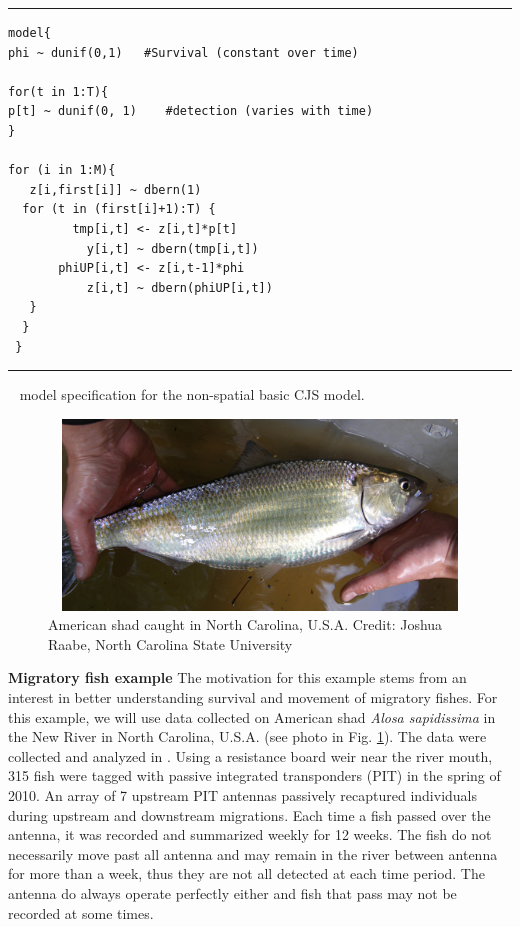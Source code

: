 \begin{panel}[htp]
\centering
\rule[0.1in]{\textwidth}{.03in}
{\small
\begin{verbatim}
model{
phi ~ dunif(0,1)   #Survival (constant over time)

for(t in 1:T){
p[t] ~ dunif(0, 1)    #detection (varies with time)
}

for (i in 1:M){
   z[i,first[i]] ~ dbern(1)
  for (t in (first[i]+1):T) {
         tmp[i,t] <- z[i,t]*p[t]
           y[i,t] ~ dbern(tmp[i,t])
       phiUP[i,t] <- z[i,t-1]*phi
           z[i,t] ~ dbern(phiUP[i,t])
   }
  }
 }
\end{verbatim}
}

\rule[-0.1in]{\textwidth}{.03in}
\caption{
\jags~ model specification for the non-spatial basic CJS model.}
\label{open.panel.nsCJS}
\end{panel}


\begin{figure}
\centering
\includegraphics[height=2in,width=4.43in]{Ch16-Open/figs/American_Shad_Raabe.jpg}
\caption{American shad caught in North Carolina, U.S.A.  Credit: Joshua Raabe, North Carolina State University}
\label{open.figs.shadpic}
\end{figure}

{\bf Migratory fish example}
The motivation for this example stems from an interest in better
understanding survival and movement of migratory fishes.  For this
example, we will use data collected on American shad \textit{Alosa sapidissima}
in the New River in North Carolina, U.S.A. (see photo in Fig. \ref{open.figs.shadpic}).
The data were collected and analyzed in \cite{raabe_diss:2012}.
Using a resistance board weir near the
river mouth, 315 fish
were tagged with passive integrated transponders (PIT) in the spring
of 2010. An array of 7 upstream PIT antennas passively recaptured
individuals during upstream and downstream migrations.  Each time a fish passed
over the antenna, it was recorded and summarized weekly for 12 weeks. The
fish do not necessarily move past all antenna and may remain in the river between 
antenna for more than a week, thus they are not all detected at each time period.
The antenna do always operate perfectly either and fish that pass may not be recorded
at some times.

